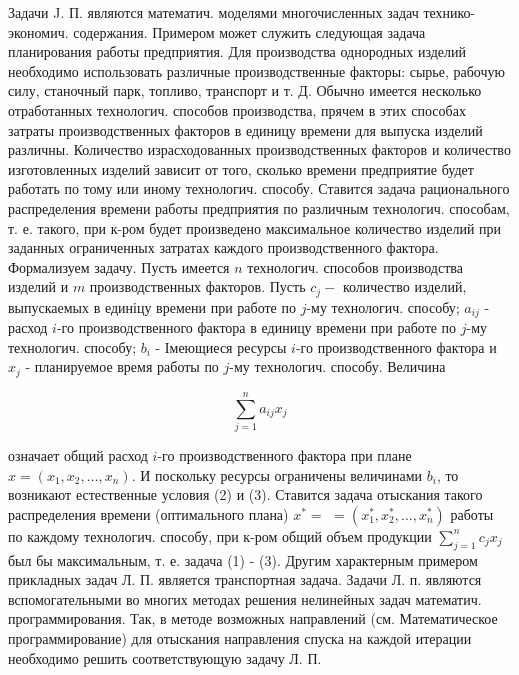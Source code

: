 \documentclass[10pt]{article}
\begin{document}
Задачи J. П. являются математич. моделями многочисленных задач технико-экономич. содержания. Примером может служить следующая задача планирования работы предприятия. Для производства однородных изделий необходимо использовать различные производственные факторы: сырье, рабочую силу, станочный парк, топливо, транспорт и т. Д. Обычно имеется несколько отработанных технологич. способов производства, прячем в этих способах затраты производственных факторов в единицу времени для выпуска изделий различны. Количество израсходованных производственных факторов и количество изготовленных изделий зависит от того, сколько времени предприятие будет работать по тому или иному технологич. способу. Ставится задача рационального распределения времени работы предприятия по различным технологич. способам, т. е. такого, при к-ром будет произведено максимальное количество изделий при заданных ограниченных затратах каждого производственного фактора. Формализуем задачу. Пусть имеется $n$ технологич. способов производства изделий и $m$ производственных факторов. Пусть $c_{j}-$ количество изделий, выпускаемых в единіцу времени при работе по $j$-му технологич. способу; $a_{i j}$ - расход $i$-го производственного фактора в единицу времени при работе по $j$-му технологич. способу; $b_{i}$ - Імеющиеся ресурсы $i$-го производственного фактора и $x_{j}$ - планируемое время работы по $j$-му технологич. способу. Величина



\[

\sum_{j=1}^{n} a_{i j} x_{j}

\]



означает общий расход $i$-го производственного фактора при плане $x=\left(x_{1}, x_{2}, \ldots, x_{n}\right)$. И поскольку ресурсы ограничены величинами $b_{i}$, то возникают естественные условия (2) и (3). Ставится задача отыскания такого распределения времени (оптимального плана) $x^{*}=$ $=\left(x_{1}^{*}, x_{2}^{*}, \ldots, x_{n}^{*}\right)$ работы по каждому технологич. способу, при к-ром общий объем продукции $\sum_{j=1}^{n} c_{j} x_{j}$ был бы максимальным, т. е. задача (1) - (3). Другим характерным примером прикладных задач Л. П. является транспортная задача. Задачи Л. п. являются вспомогательными во многих методах решения нелинейных задач математич. программирования. Так, в методе возможных направлений (см. Математическое программирование) для отыскания направления спуска на каждой итерации необходимо решить соответствующую задачу Л. П.
\end{document}
